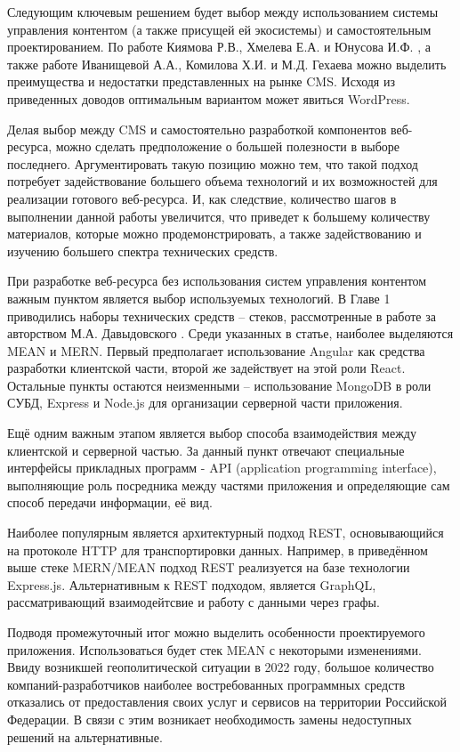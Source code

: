 Следующим ключевым решением будет выбор между использованием системы управления контентом (а также присущей ей экосистемы) и самостоятельным проектированием.
По работе Киямова Р.В., Хмелева Е.А. и Юнусова И.Ф. \cite{kiyamov-cms}, а также работе Иванищевой А.А., Комилова Х.И. и М.Д. Гехаева \cite{ivanisheva-cms} можно выделить преимущества и недостатки представленных на рынке CMS.
Исходя из приведенных доводов оптимальным вариантом может явиться WordPress.

Делая выбор между CMS и самостоятельно разработкой компонентов веб-ресурса, можно сделать предположение о большей полезности в выборе последнего.
Аргументировать такую позицию можно тем, что такой подход потребует задействование большего объема технологий и их возможностей для реализации готового веб-ресурса.
И, как следствие, количество шагов в выполнении данной работы увеличится, что приведет к большему количеству материалов, которые можно продемонстрировать, а также задействованию и изучению большего спектра технических средств.

При разработке веб-ресурса без использования систем управления контентом важным пунктом является выбор используемых технологий.
В Главе 1 приводились наборы технических средств -- стеков, рассмотренные в работе за авторством М.А. Давыдовского \cite{davidovsky-vibor}.
Среди указанных в статье, наиболее выделяются MEAN и MERN.
Первый предполагает использование Angular как средства разработки клиентской части, второй же задействует на этой роли React.
Остальные пункты остаются неизменными -- использование MongoDB в роли СУБД, Express и Node.js для организации серверной части приложения.

Ещё одним важным этапом является выбор способа взаимодействия между клиентской и серверной частью.
За данный пункт отвечают специальные интерфейсы прикладных программ - API (application programming interface), выполняющие роль посредника между частями приложения и определяющие сам способ передачи информации, её вид.

Наиболее популярным является архитектурный подход REST, основывающийся на протоколе HTTP для транспортировки данных.
Например, в приведённом выше стеке MERN/MEAN подход REST реализуется на базе технологии Express.js.
Альтернативным к REST подходом, является GraphQL, рассматривающий взаимодейтсвие и работу с данными через графы.

Подводя промежуточный итог можно выделить особенности проектируемого приложения.
Использоваться будет стек MEAN с некоторыми изменениями.
Ввиду возникшей геополитической ситуации в 2022 году, большое количество компаний-разработчиков наиболее востребованных программных средств отказались от предоставления своих услуг и сервисов на территории Российской Федерации.
В связи с этим возникает необходимость замены недоступных решений на альтернативные.


